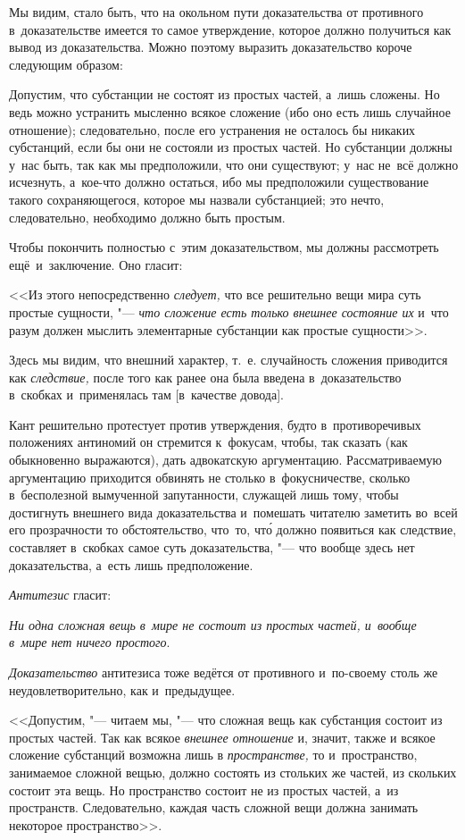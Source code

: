 Мы видим, стало быть, что на окольном пути доказательства от
противного в~доказательстве имеется то самое утверждение, которое
должно получиться как вывод из доказательства. Можно поэтому
выразить доказательство короче следующим образом:

Допустим, что субстанции не состоят из простых частей, а~лишь сложены.
Но ведь можно устранить мысленно всякое сложение (ибо оно есть лишь случайное
отношение); следовательно, после его устранения не осталось бы никаких
субстанций, если бы они не состояли из простых частей. Но субстанции должны
у~нас быть, так как мы предположили, что они существуют; у~нас не~всё должно
исчезнуть, а~кое-что должно остаться, ибо мы предположили существование такого
сохраняющегося, которое мы назвали субстанцией; это нечто, следовательно,
необходимо должно быть простым.

Чтобы покончить полностью с~этим доказательством, мы должны рассмотреть
ещё~и~заключение. Оно гласит:

<<Из этого непосредственно {\em следует,} что все решительно вещи мира суть
простые сущности, "--- {\em что сложение есть только внешнее состояние их}
и~что разум должен мыслить элементарные субстанции как простые сущности>>.

Здесь мы видим, что внешний характер, т.~е. случайность сложения приводится
как {\em следствие,} после того как ранее она была введена в~доказательство
в~скобках и~применялась там [в~качестве довода].

Кант решительно протестует против утверждения, будто в~противоречивых
положениях антиномий он стремится к~фокусам, чтобы, так сказать (как
обыкновенно выражаются), дать адвокатскую аргументацию. Рассматриваемую
аргументацию приходится обвинять не столько в~фокусничестве, сколько
в~бесполезной вымученной запутанности, служащей лишь тому, чтобы достигнуть
внешнего вида доказательства и~помешать читателю заметить во~всей его
прозрачности то обстоятельство, что~то, чт\'{о} должно появиться как следствие,
составляет в~скобках самое суть доказательства, "--- что вообще здесь
нет доказательства, а~есть лишь предположение.

{\em Антитезис} гласит:

{\em Ни одна сложная вещь в~мире не состоит из простых частей,
и~вообще в~мире нет ничего простого}.

{\em Доказательство} антитезиса тоже ведётся от противного и~по-своему
столь же неудовлетворительно, как и~предыдущее.

<<Допустим, "--- читаем мы, "--- что сложная вещь как субстанция состоит из
простых частей. Так как всякое {\em внешнее отношение} и, значит, также и
всякое сложение субстанций возможна лишь в {\em пространстве,} то
и~пространство, занимаемое сложной вещью, должно состоять из стольких же
частей, из скольких состоит эта вещь. Но пространство состоит не из простых
частей, а~из пространств. Следовательно, каждая часть сложной вещи должна занимать
некоторое пространство>>.

